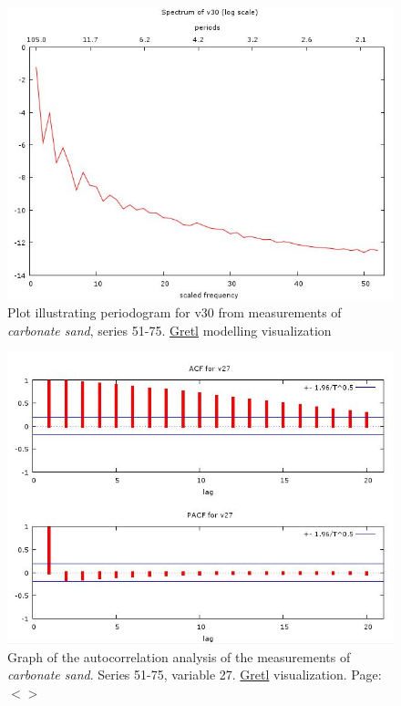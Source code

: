 \documentclass[11pt]{article}
\begin{document}
\begin{appendices}
\begin{figure}[H]
	\begin{center}
		\includegraphics[scale=0.4]{G-period-sand30.jpg}
		\caption{Plot illustrating periodogram for v30 from measurements of \textit{carbonate sand}, series 51-75. \href{http://gretl.sourceforge.net/}{Gretl} modelling visualization­}\label{fig:A.31}
	\end{center}	
\end{figure}
\begin{figure}[H]
	\begin{center}
	\includegraphics[scale=0.4]{G-autocorr-sand51-75.jpg}
	\caption{Graph of the autocorrelation analysis of the measurements of \textit{carbonate sand}. Series 51-75, variable 27. \href{http://gretl.sourceforge.net/}{Gretl} visualization. Page: $<$\pageref{page-41}$>$­}
	\label{fig:A.29}
	\end{center}
\end{figure}


\end{appendices}
\end{document}
